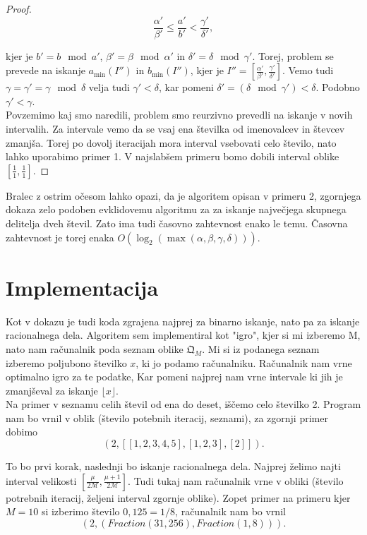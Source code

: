 \documentclass[a4paper,14pt]{article}
\theoremstyle{definition} %
\theoremstyle{plain} %
\begin{document}
\begin{proof}
$$\frac{\alpha'}{\beta'} \leq \frac{a'}{b'} < \frac{\gamma'}{\delta'},$$

kjer je $b' = b \mod a'$, $\beta' = \beta \mod \alpha'$ in $\delta' = \delta \mod \gamma'$. 
Torej, problem se prevede na iskanje $a_{\min}(I'')$ in $b_{\min}(I'')$, kjer je $I'' = \left[\frac{\alpha'}{\beta'}, \frac{\gamma'}{\delta'}\right]$. 
Vemo tudi $\gamma = \gamma' = \gamma \mod \delta$ velja tudi $\gamma' < \delta$, kar pomeni $\delta' = (\delta \mod \gamma') < \delta$. Podobno $\gamma' < \gamma$.\\

Povzemimo kaj smo naredili, problem smo reurzivno prevedli na iskanje v novih intervalih.
Za intervale vemo da se vsaj ena številka od imenovalcev in števcev zmanjša.
Torej po dovolj iteracijah mora interval vsebovati celo število, nato lahko uporabimo primer 1.
V najslabšem primeru bomo dobili interval oblike $\left[\frac{1}{1}, \frac{1}{1}\right]$.

\end{proof}

Bralec z ostrim očesom lahko opazi, da je algoritem opisan v primeru 2, zgornjega dokaza zelo podoben evklidovemu algoritmu za 
za iskanje največjega skupnega delitelja dveh števil. 
Zato ima tudi časovno zahtevnost enako le temu. 
Časovna zahtevnost je torej enaka $O(\log_2(\max(\alpha, \beta, \gamma, \delta)))$.

\section{Implementacija}

Kot v dokazu je tudi koda zgrajena najprej za binarno iskanje, nato pa za iskanje racionalnega dela.
Algoritem sem implementiral kot "igro", kjer si mi izberemo M, 
nato nam računalnik poda seznam oblike $\mathfrak{Q}_M$. 
Mi si iz podanega seznam izberemo poljubono številko $x$, ki jo podamo računalniku.
Računalnik nam vrne optimalno igro za te podatke, Kar pomeni najprej nam vrne intervale ki jih je zmanjševal za iskanje $\lfloor x \rfloor$.\\

Na primer v seznamu celih števil od ena do deset, iščemo celo številko 2.
Program nam bo vrnil v oblik (število potebnih iteracij, seznami), za zgornji primer dobimo $$(2, [[1, 2, 3, 4, 5], [1, 2, 3], [2]]).$$

To bo prvi korak, naslednji bo iskanje racionalnega dela.
Najprej želimo najti interval velikosti $\left[\frac{\mu}{2\mathcal{M}}, \frac{\mu +1}{2\mathcal{M}}\right]$.
Tudi tukaj nam računalnik vrne v obliki (število potrebnih iteracij, željeni interval zgornje oblike).
Zopet primer na primeru kjer $M=10$ si izberimo število $0,125= 1/8$, 
računalnik nam bo vrnil $$(2,(Fraction(31, 256), Fraction(1, 8))).$$
\end{document}

